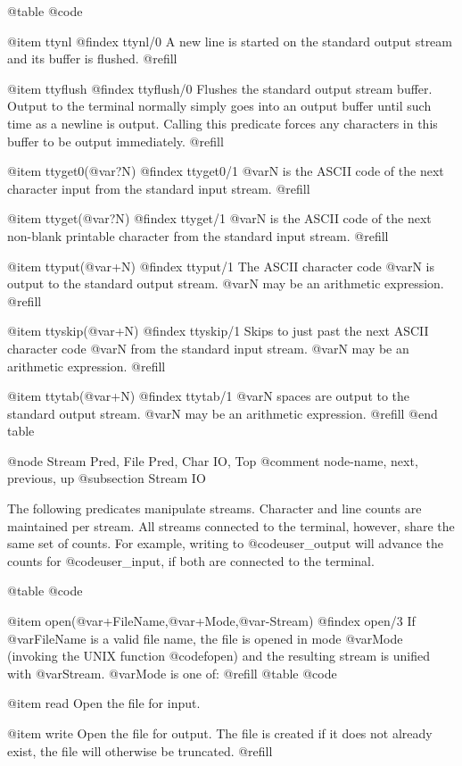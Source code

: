 @table @code

@item ttynl
@findex ttynl/0
A new line is started on the standard output stream and its buffer is
flushed. @refill

@item ttyflush
@findex ttyflush/0
Flushes the standard output stream buffer.  Output to the terminal
normally simply goes into an output buffer until such time as a newline
is output.  Calling this predicate forces any characters in this buffer
to be output immediately.  @refill

@item ttyget0(@var{?N})
@findex ttyget0/1
@var{N} is the ASCII code of the next character input from the standard
input stream. @refill

@item ttyget(@var{?N})
@findex ttyget/1
@var{N} is the ASCII code of the next non-blank printable character from
the standard input stream. @refill

@item ttyput(@var{+N})
@findex ttyput/1
The ASCII character code @var{N} is output to the standard output
stream.  @var{N} may be an arithmetic expression. @refill

@item ttyskip(@var{+N})
@findex ttyskip/1
Skips to just past the next ASCII character code @var{N} from the
standard input stream.  @var{N} may be an arithmetic expression. @refill

@item ttytab(@var{+N})
@findex ttytab/1
@var{N} spaces are output to the standard output stream.  @var{N} may be
an arithmetic expression. @refill
@end table

@node Stream Pred, File Pred, Char IO, Top
@comment  node-name,  next,  previous,  up
@subsection Stream IO

The following predicates manipulate streams.  Character and line counts
are maintained per stream.  All streams connected to the terminal,
however, share the same set of counts.  For example, writing to
@code{user_output} will advance the counts for @code{user_input}, if
both are connected to the terminal.

@table @code

@item open(@var{+FileName},@var{+Mode},@var{-Stream})
@findex open/3
If @var{FileName} is a valid file name, the file is opened in mode
@var{Mode} (invoking the UNIX function @code{fopen}) and the resulting
stream is unified with @var{Stream}.  @var{Mode} is one of: @refill
@table @code

@item read
Open the file for input.

@item write
Open the file for output.  The file is created if it does not already exist,
the file will otherwise be truncated. @refill

